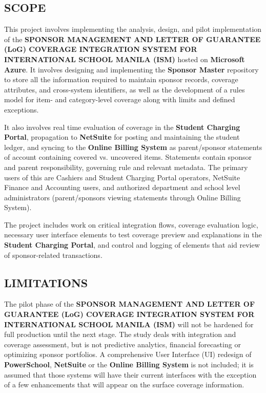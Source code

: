 \subsection{SCOPE}

    This project involves implementing the analysis, design, and pilot implementation of the \textbf{SPONSOR MANAGEMENT AND LETTER OF GUARANTEE (LoG) COVERAGE INTEGRATION SYSTEM FOR INTERNATIONAL SCHOOL MANILA (ISM)} hosted on \textbf{Microsoft Azure}. It involves designing and implementing the \textbf{Sponsor Master} repository to store all the information required to maintain sponsor records, coverage attributes, and cross-system identifiers, as well as the development of a rules model for item- and category-level coverage along with limits and defined exceptions.
    
    It also involves real time evaluation of coverage in the \textbf{Student Charging Portal}, propagation to \textbf{NetSuite} for posting and maintaining the student ledger, and syncing to the \textbf{Online Billing System} as parent/sponsor statements of account containing covered vs. uncovered items. Statements contain sponsor and parent responsibility, governing rule and relevant metadata. The primary users of this are Cashiers and Student Charging Portal operators, NetSuite Finance and Accounting users, and authorized department and school level administrators (parent/sponsors viewing statements through Online Billing System).
    
    The project includes work on critical integration flows, coverage evaluation logic, necessary user interface elements to test coverage preview and explanations in the \textbf{Student Charging Portal}, and control and logging of elements that aid review of sponsor-related transactions.

\subsection{LIMITATIONS}

    The pilot phase of the \textbf{SPONSOR MANAGEMENT AND LETTER OF GUARANTEE (LoG) COVERAGE INTEGRATION SYSTEM FOR INTERNATIONAL SCHOOL MANILA (ISM)} will not be hardened for full production until the next stage. The study deals with integration and coverage assessment, but is not predictive analytics, financial forecasting or optimizing sponsor portfolios. A comprehensive User Interface (UI) redesign of \textbf{PowerSchool}, \textbf{NetSuite} or the \textbf{Online Billing System} is not included; it is assumed that those systems will have their current interfaces with the exception of a few enhancements that will appear on the surface coverage information.
    
